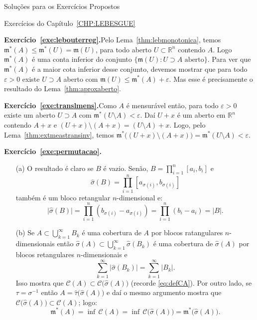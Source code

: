 \documentclass[oneside,final,11pt]{amsbook}
\newcommand{\R}{\mathds R}
\newcommand{\leb}{\mathfrak m}
\theoremstyle{remark}\newtheorem{exercise}{Exercício}[chapter]
\theoremstyle{remark}\newtheorem{*exercise}[exercise]{\hbox to 0pt{\hskip 0pt minus 1fil*}Exercício}
\theoremstyle{definition}\newtheorem{exdefin}{Definição}[chapter]
\theoremstyle{plain}\newtheorem{teo}{Teorema}[section]
\theoremstyle{plain}\newtheorem{lem}[teo]{Lema}
\theoremstyle{plain}\newtheorem{prop}[teo]{Proposição}
\theoremstyle{plain}\newtheorem{cor}[teo]{Corolário}
\theoremstyle{definition}\newtheorem{defin}[teo]{Definição}
\theoremstyle{remark}\newtheorem{rem}[teo]{Observação}
\theoremstyle{definition}\newtheorem{notation}[teo]{Notação}
\theoremstyle{definition}\newtheorem{convention}[teo]{Convenção}
\theoremstyle{definition}\newtheorem{example}[teo]{Exemplo}
\numberwithin{section}{chapter}
\numberwithin{equation}{section}
\begin{document}
\begin{chapter}{Soluções para os Exercícios Propostos}

\begin{section}{Exercícios do Capítulo~\ref{CHP:LEBESGUE}}

\textbf{Exercício~\ref{exe:lebouterreg}.}\enspace Pelo Lema~\ref{thm:lebmonotonica}, temos
$\leb^*(A)\le\leb^*(U)=\leb(U)$, para todo aberto $U\subset\R^n$ contendo $A$. Logo
$\leb^*(A)$ é uma conta inferior do conjunto $\big\{\leb(U):\text{$U\supset A$ aberto}\big\}$.
Para ver que $\leb^*(A)$ é a maior cota inferior desse conjunto, devemos mostrar que para todo
$\varepsilon>0$ existe $U\supset A$ aberto com $\leb(U)\le\leb^*(A)+\varepsilon$. Mas esse é precisamente
o resultado do Lema~\ref{thm:aproxaberto}.

\medskip

\textbf{Exercício~\ref{exe:translmens}.}\enspace Como $A$ é mensurável então, para todo $\varepsilon>0$ existe
um aberto $U\supset A$ com $\leb^*(U\setminus A)<\varepsilon$.
Daí $U+x$ é um aberto em $\R^n$ contendo
$A+x$ e $(U+x)\setminus(A+x)=(U\setminus A)+x$. Logo, pelo Lema~\ref{thm:extmeastransinv}, temos
$\leb^*\big((U+x)\setminus(A+x)\big)=\leb^*(U\setminus A)<\varepsilon$.

\medskip

\textbf{Exercício~\ref{exe:permutacao}.}
\begin{itemize}
\item[(a)] O resultado é claro se $B$ é vazio. Senão, $B=\prod_{i=1}^n[a_i,b_i]$ e
\[\widehat\sigma(B)=\prod_{i=1}^n[a_{\sigma(i)},b_{\sigma(i)}]\]
também é um bloco retangular $n$-dimensional e:
\[\vert\widehat\sigma(B)\vert=\prod_{i=1}^n(b_{\sigma(i)}-a_{\sigma(i)})=\prod_{i=1}^n(b_i-a_i)=\vert B\vert.\]

\smallskip

\item[(b)] Se $A\subset\bigcup_{k=1}^\infty B_k$ é uma cobertura de $A$ por blocos ratangulares
$n$-dimensionais então $\widehat\sigma(A)\subset\bigcup_{k=1}^\infty\widehat\sigma(B_k)$
é uma cobertura de $\widehat\sigma(A)$ por blocos retangulares $n$-dimensionais e
\[\sum_{k=1}^\infty\vert\widehat\sigma(B_k)\vert=\sum_{k=1}^\infty\vert B_k\vert.\]
Isso mostra que $\mathcal C(A)\subset\mathcal C\big(\widehat\sigma(A)\big)$
(recorde \eqref{eq:defCA}). Por outro lado, se $\tau=\sigma^{-1}$
então $A=\widehat\tau\big(\widehat\sigma(A)\big)$ e daí o mesmo argumento mostra que
$\mathcal C\big(\widehat\sigma(A)\big)\subset\mathcal C(A)$; logo:
\[\leb^*(A)=\inf\,\mathcal C(A)=\inf\,\mathcal C\big(\widehat\sigma(A)\big)=\leb^*\big(\widehat\sigma(A)\big).\]


\end{itemize}
\end{section}
\end{chapter}
\end{document}
